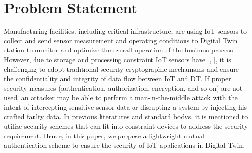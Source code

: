 \section{Problem Statement}


Manufacturing facilities, including critical infrastructure,  are using IoT sensors to collect and send sensor measurement and operating conditions to Digital Twin station to monitor and optimize the overall operation of the business process \.  However, due to storage and processing constraint IoT sensors have[ \cite{williams_survey_2022}, \cite{noauthor_lightweight_nodate}], it is challenging to adopt traditional security cryptographic mechanisms and ensure the confidentiality and integrity of data flow between IoT and DT. If proper security measures (authentication, authorization, encryption, and so on) are not used, an attacker may be able to perform a man-in-the-middle attack with the intent of intercepting sensitive sensor data or disrupting a system by injecting his crafted faulty data. In previous literatures and standard bodys, it is mentioned to utilize security schemes that can fit into constraint devices to address the security requirement. Hence, in this paper, we propose a lightweight mutual authentication scheme to ensure the security of IoT applications in Digital Twin.